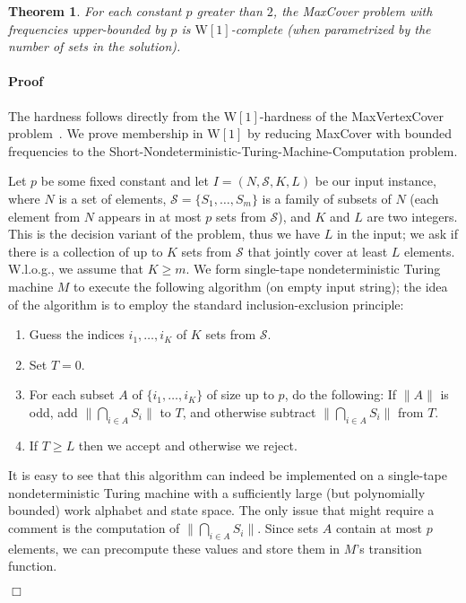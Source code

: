 \documentclass[11pt]{article}
\newtheorem{theorem}{Theorem}
\newenvironment{proof}{\paragraph{Proof}}{\hfill$\Box$\medskip}
\newcommand{\wone}{{\mathrm{W[1]}}}
\newcommand{\calS}{{{\mathcal{S}}}}
\begin{document}
\begin{theorem}
  For each constant $p$ greater than $2$, the MaxCover problem with
  frequencies upper-bounded by $p$ is $\wone$-complete (when
  parametrized by the number of sets in the solution).
\end{theorem}
\begin{proof}
  The hardness follows directly from the $\wone$-hardness of the
  MaxVertexCover problem~\cite{guo-nie-wer:j:vertex-cover-variants}.
  We prove membership in $\wone$ by reducing MaxCover with bounded
  frequencies to the Short-Nondeterministic-Turing-Machine-Computation
  problem.

  Let $p$ be some fixed constant and let $I = (N,\calS,K,L)$ be our
  input instance, where $N$ is a set of elements, $\calS = \{S_1,
  \ldots, S_m\}$ is a family of subsets of $N$ (each element from $N$
  appears in at most $p$ sets from $\calS$), and $K$ and $L$ are two
  integers. This is the decision variant of the problem, thus we have
  $L$ in the input; we ask if there is a collection of up to $K$ sets
  from $\calS$ that jointly cover at least $L$ elements.  W.l.o.g., we
  assume that $K \geq m$. We form single-tape nondeterministic Turing
  machine $M$ to execute the following algorithm (on empty input
  string); the idea of the algorithm is to employ the standard
  inclusion-exclusion principle:
  \begin{enumerate}
  \item Guess the indices $i_1, \ldots, i_K$ of $K$ sets from $\calS$.
  \item Set $T = 0$.
  \item For each subset $A$ of $\{i_1, \ldots, i_K\}$ of size up to
    $p$, do the following: If $\|A\|$ is odd, add $\|\bigcap_{i \in
      A}S_i\|$ to $T$, and otherwise subtract $\|\bigcap_{i \in
      A}S_i\|$ from $T$.
  \item If $T \geq L$ then we accept and otherwise we reject.
  \end{enumerate}
  It is easy to see that this algorithm can indeed be implemented on a
  single-tape nondeterministic Turing machine with a sufficiently
  large (but polynomially bounded) work alphabet and state space.  The
  only issue that might require a comment is the computation of
  $\|\bigcap_{i \in A}S_i\|$. Since sets $A$ contain at most $p$
  elements, we can precompute these values and store them in $M$'s
  transition function.


\end{proof}
\end{document}
